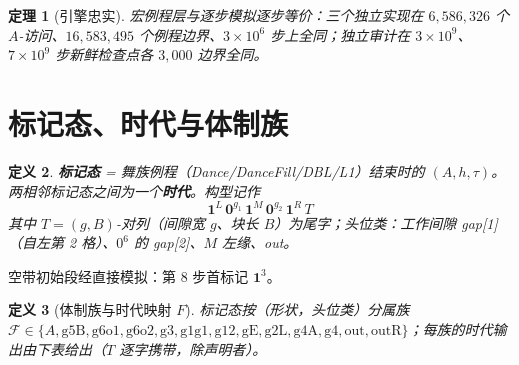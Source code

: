 \documentclass[11pt]{ctexart}
\newtheorem{theorem}{定理}[section]
\newtheorem{definition}[theorem]{定义}
\begin{document}
\begin{theorem}[引擎忠实]\label{lem:faith}
宏例程层与逐步模拟逐步等价：三个独立实现在 $6{,}586{,}326$ 个 $A$-访问、$16{,}583{,}495$ 个例程边界、$3{\times}10^6$ 步上全同；独立审计在 $3\times10^9$、$7\times10^9$ 步新鲜检查点各 $3{,}000$ 边界全同。
\end{theorem}

\section{标记态、时代与体制族}

\begin{definition}
\textbf{标记态} = 舞族例程（Dance/DanceFill/DBL/L1）结束时的 $(A,h,\tau)$。两相邻标记态之间为一个\textbf{时代}。构型记作
\[
\mathbf{1}^L\,\mathbf 0^{g_1}\,\mathbf 1^M\,\mathbf 0^{g_2}\,\mathbf 1^R\,T
\]
其中 $T=(g,B)$-对列（间隙宽 $g$、块长 $B$）为尾字；头位类：工作间隙 gap[1]（自左第 2 格）、$0^6$ 的 gap[2]、$M$ 左缘、out。
\end{definition}

空带初始段经直接模拟：第 8 步首标记 $\mathbf 1^3$。

\begin{definition}[体制族与时代映射 $F$]
标记态按（形状，头位类）分属族 $\mathcal F\in\{A,\mathrm{g5B},\mathrm{g6o1},\mathrm{g6o2},\mathrm{g3},\mathrm{g1g1},\mathrm{g12},\mathrm{gE},\mathrm{g2L},\mathrm{g4A},\mathrm{g4},\mathrm{out},\mathrm{outR}\}$；每族的时代输出由下表给出（$T$ 逐字携带，除声明者）。
\end{definition}
\end{document}
